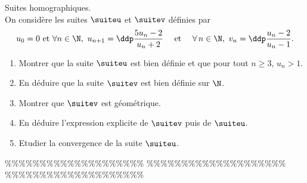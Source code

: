



\begin{exercice}  \; Suites homographiques.\\
\noindent On consid\`ere les suites $\suiteu$ et $\suitev$ d\'efinies par
$$u_0=0\ \hbox{et}\ \forall n\in\N,\ u_{n+1}=\ddp\frac{5u_n-2}{u_n+2} \quad \textmd{ et } \quad \forall \, n \in \N, \ v_n = \ddp\frac{u_n-2}{u_n-1}.$$
\begin{enumerate}
 \item
Montrer que la suite $\suiteu$ est bien d\'efinie et que pour tout $n\geq 3$, $u_n>1$. 
\item 
En d\'eduire que la suite $\suitev$  est bien d\'efinie sur $\N$.
\item 
Montrer que $\suitev$ est g\'eom\'etrique.
\item 
En d\'eduire l'expression explicite de $\suitev$ puis de $\suiteu$.
\item Etudier la convergence de la suite $\suiteu$.
\end{enumerate}
\end{exercice}


\%\%\%\%\%\%\%\%\%\%\%\%\%\%\%\%\%\%\%\%
\%\%\%\%\%\%\%\%\%\%\%\%\%\%\%\%\%\%\%\%
\%\%\%\%\%\%\%\%\%\%\%\%\%\%\%\%\%\%\%\%




